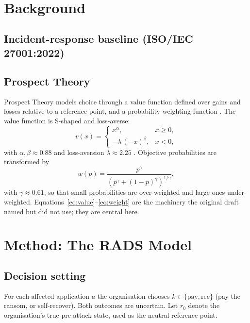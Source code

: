 \documentclass[jcp,article,submit,pdftex,moreauthors]{Definitions/mdpi}
\begin{document}
\section{Background}\label{sec:background}

\subsection{Incident-response baseline (ISO/IEC 27001:2022)}
\cite{bib_iso}

\subsection{Prospect Theory}
Prospect Theory \cite{bib_prospecttheory} models choice through a value
function defined over gains and losses relative to a reference point, and a
probability-weighting function \cite{bib_cpt1992}. The value function is
S-shaped and loss-averse:
\begin{equation}\label{eq:value}
v(x)=
\begin{cases}
x^{\alpha}, & x \ge 0,\\[4pt]
-\lambda\,(-x)^{\beta}, & x < 0,
\end{cases}
\end{equation}
with $\alpha,\beta \approx 0.88$ and loss-aversion $\lambda \approx 2.25$
\cite{bib_cpt1992}. Objective probabilities are transformed by
\begin{equation}\label{eq:weight}
w(p)=\frac{p^{\gamma}}{\left(p^{\gamma}+(1-p)^{\gamma}\right)^{1/\gamma}},
\end{equation}
with $\gamma \approx 0.61$, so that small probabilities are over-weighted and
large ones under-weighted. Equations~\eqref{eq:value}--\eqref{eq:weight} are
the machinery the original draft named but did not use; they are central here.

\section{Method: The RADS Model}\label{sec:method}

\subsection{Decision setting}
For each affected application $a$ the organisation chooses
$k\in\{\mathrm{pay},\mathrm{rec}\}$ (pay the ransom, or self-recover). Both
outcomes are uncertain. Let $r_0$ denote the organisation's true pre-attack
state, used as the neutral reference point.
\end{document}
